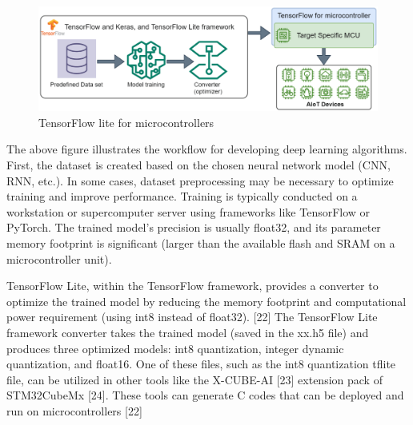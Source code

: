 \begin{center}
    \begin{figure}[!htp]
        \centering
        \includegraphics[width=0.8 \textwidth]{image/tf_lite.png}
        \caption{TensorFlow lite for microcontrollers}
        \label{subsection}
    \end{figure}
    \end{center}

The above figure illustrates the workflow for developing deep learning algorithms. First, the dataset is created based on the chosen neural network model (CNN, RNN, etc.). 
In some cases, dataset preprocessing may be necessary to optimize training and improve performance. Training is typically conducted on a workstation or supercomputer server using frameworks like TensorFlow or PyTorch. 
The trained model's precision is usually float32, and its parameter memory footprint is significant (larger than the available flash and SRAM on a microcontroller unit).

TensorFlow Lite, within the TensorFlow framework, provides a converter to optimize the trained model by reducing the memory footprint and computational power requirement (using int8 instead of float32). [22]
The TensorFlow Lite framework converter takes the trained model (saved in the xx.h5 file) and produces three optimized models: int8 quantization, integer dynamic quantization, and float16. One of these files, such as the int8 quantization tflite file, 
can be utilized in other tools like the X-CUBE-AI [23] extension pack of STM32CubeMx [24]. These tools can generate C codes that can be deployed and run on microcontrollers [22]
